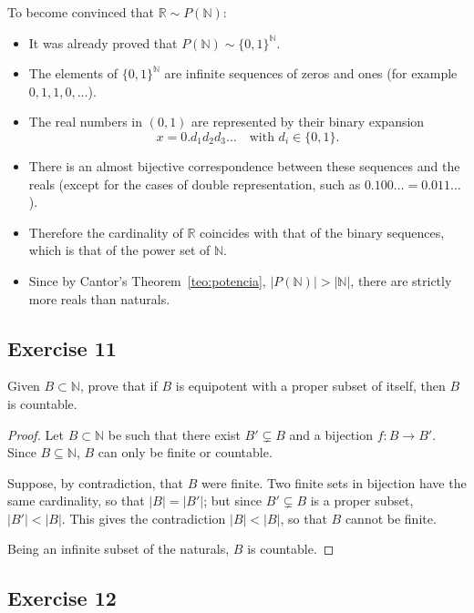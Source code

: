 \documentclass[11pt, a4paper]{article}
\begin{document}
To become convinced that $\mathbb{R} \sim P(\mathbb{N})$:
\begin{itemize}
    \item It was already proved that $P(\mathbb{N}) \sim \{0,1\}^{\mathbb{N}}$.
    \item The elements of $\{0,1\}^{\mathbb{N}}$ are infinite sequences of zeros and ones (for
    example $0, 1, 1, 0, \dots$).
    \item The real numbers in $(0,1)$ are represented by their binary expansion
    $$ x = 0.d_1 d_2 d_3 \dots \quad \text{with } d_i \in \{0,1\}. $$
    \item There is an almost bijective correspondence between these sequences and the reals (except for the cases
    of double representation, such as $0.100\dots = 0.011\dots$).
    \item Therefore the cardinality of $\mathbb{R}$ coincides with that of the binary sequences, which is
    that of the power set of $\mathbb{N}$.
    \item Since by Cantor's Theorem~\ref{teo:potencia}, $|P(\mathbb{N})| > |\mathbb{N}|$, there are
    strictly more reals than naturals.
\end{itemize}

\subsection*{Exercise 11}

Given $B \subset \mathbb{N}$, prove that if $B$ is equipotent with a proper subset of itself,
then $B$ is countable.

\begin{proof}
Let $B \subset \mathbb{N}$ be such that there exist $B' \subsetneq B$ and a bijection $f: B \to B'$. Since
$B \subseteq \mathbb{N}$, $B$ can only be finite or countable.

Suppose, by contradiction, that $B$ were finite. Two finite sets in bijection have the same cardinality, so that
$|B| = |B'|$; but since $B' \subsetneq B$ is a proper subset, $|B'| < |B|$. This gives the contradiction
$|B| < |B|$, so that $B$ cannot be finite.

Being an infinite subset of the naturals, $B$ is countable.
\end{proof}

\subsection*{Exercise 12}
\end{document}
